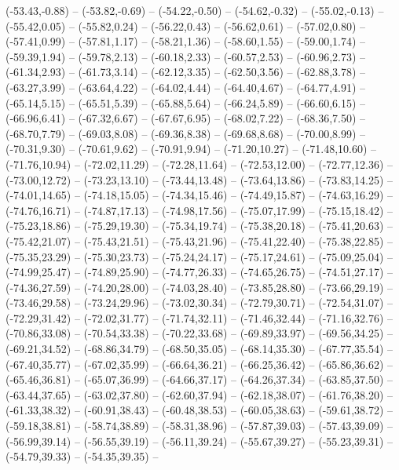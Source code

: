 {  (-53.43,-0.88) -- (-53.82,-0.69) -- (-54.22,-0.50) -- (-54.62,-0.32) -- (-55.02,-0.13) -- (-55.42,0.05) -- (-55.82,0.24) --
  (-56.22,0.43) -- (-56.62,0.61) -- (-57.02,0.80) -- (-57.41,0.99) -- (-57.81,1.17) -- (-58.21,1.36) -- (-58.60,1.55) --
  (-59.00,1.74) -- (-59.39,1.94) -- (-59.78,2.13) -- (-60.18,2.33) -- (-60.57,2.53) -- (-60.96,2.73) -- (-61.34,2.93) --
  (-61.73,3.14) -- (-62.12,3.35) -- (-62.50,3.56) -- (-62.88,3.78) -- (-63.27,3.99) -- (-63.64,4.22) -- (-64.02,4.44) --
  (-64.40,4.67) -- (-64.77,4.91) -- (-65.14,5.15) -- (-65.51,5.39) -- (-65.88,5.64) -- (-66.24,5.89) -- (-66.60,6.15) --
  (-66.96,6.41) -- (-67.32,6.67) -- (-67.67,6.95) -- (-68.02,7.22) -- (-68.36,7.50) -- (-68.70,7.79) -- (-69.03,8.08) --
  (-69.36,8.38) -- (-69.68,8.68) -- (-70.00,8.99) -- (-70.31,9.30) -- (-70.61,9.62) -- (-70.91,9.94) -- (-71.20,10.27) --
  (-71.48,10.60) -- (-71.76,10.94) -- (-72.02,11.29) -- (-72.28,11.64) -- (-72.53,12.00) -- (-72.77,12.36) -- (-73.00,12.72) --
  (-73.23,13.10) -- (-73.44,13.48) -- (-73.64,13.86) -- (-73.83,14.25) -- (-74.01,14.65) -- (-74.18,15.05) -- (-74.34,15.46) --
  (-74.49,15.87) -- (-74.63,16.29) -- (-74.76,16.71) -- (-74.87,17.13) -- (-74.98,17.56) -- (-75.07,17.99) -- (-75.15,18.42) --
  (-75.23,18.86) -- (-75.29,19.30) -- (-75.34,19.74) -- (-75.38,20.18) -- (-75.41,20.63) -- (-75.42,21.07) -- (-75.43,21.51) --
  (-75.43,21.96) -- (-75.41,22.40) -- (-75.38,22.85) -- (-75.35,23.29) -- (-75.30,23.73) -- (-75.24,24.17) -- (-75.17,24.61) --
  (-75.09,25.04) -- (-74.99,25.47) -- (-74.89,25.90) -- (-74.77,26.33) -- (-74.65,26.75) -- (-74.51,27.17) -- (-74.36,27.59) --
  (-74.20,28.00) -- (-74.03,28.40) -- (-73.85,28.80) -- (-73.66,29.19) -- (-73.46,29.58) -- (-73.24,29.96) -- (-73.02,30.34) --
  (-72.79,30.71) -- (-72.54,31.07) -- (-72.29,31.42) -- (-72.02,31.77) -- (-71.74,32.11) -- (-71.46,32.44) -- (-71.16,32.76) --
  (-70.86,33.08) -- (-70.54,33.38) -- (-70.22,33.68) -- (-69.89,33.97) -- (-69.56,34.25) -- (-69.21,34.52) -- (-68.86,34.79) --
  (-68.50,35.05) -- (-68.14,35.30) -- (-67.77,35.54) -- (-67.40,35.77) -- (-67.02,35.99) -- (-66.64,36.21) -- (-66.25,36.42) --
  (-65.86,36.62) -- (-65.46,36.81) -- (-65.07,36.99) -- (-64.66,37.17) -- (-64.26,37.34) -- (-63.85,37.50) -- (-63.44,37.65) --
  (-63.02,37.80) -- (-62.60,37.94) -- (-62.18,38.07) -- (-61.76,38.20) -- (-61.33,38.32) -- (-60.91,38.43) -- (-60.48,38.53) --
  (-60.05,38.63) -- (-59.61,38.72) -- (-59.18,38.81) -- (-58.74,38.89) -- (-58.31,38.96) -- (-57.87,39.03) -- (-57.43,39.09) --
  (-56.99,39.14) -- (-56.55,39.19) -- (-56.11,39.24) -- (-55.67,39.27) -- (-55.23,39.31) -- (-54.79,39.33) -- (-54.35,39.35) --
}
